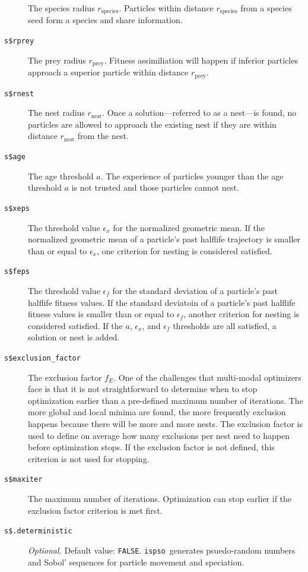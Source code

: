 \documentclass{article}
\def\ispso{\texttt{ispso}}
\begin{document}
\begin{description}
    The species radius $r_\text{species}$.
    Particles within distance $r_\text{species}$ from a species seed form a species and share information.
  \item[\texttt{s\$rprey}]
    The prey radius $r_\text{prey}$.
    Fitness assimiliation will happen if inferior particles approach a superior particle within distance $r_\text{prey}$.
  \item[\texttt{s\$rnest}]
    The nest radius $r_\text{nest}$.
    Once a solution---referred to as a nest---is found, no particles are allowed to approach the existing nest if they are within distance $r_\text{nest}$ from the nest.
  \item[\texttt{s\$age}]
    The age threshold $a$.
    The experience of particles younger than the age threshold $a$ is not trusted and those particles cannot nest.
  \item[\texttt{s\$xeps}]
    The threshold value $\epsilon_x$ for the normalized geometric mean.
    If the normalized geometric mean of a particle's past halflife trajectory is smaller than or equal to $\epsilon_x$, one criterion for nesting is considered satisfied.
  \item[\texttt{s\$feps}]
    The threshold value $\epsilon_f$ for the standard deviation of a particle's past halflife fitness values.
    If the standard deviatoin of a particle's past halflife fitness values is smaller than or equal to $\epsilon_f$, another criterion for nesting is considered satisfied.
    If the $a$, $\epsilon_x$, and $\epsilon_f$ thresholds are all satisfied, a solution or nest is added.
  \item[\texttt{s\$exclusion\_factor}]
    The exclusion factor $f_E$.
    One of the challenges that multi-modal optimizers face is that it is not straightforward to determine when to stop optimization earlier than a pre-defined maximum number of iterations.
    The more global and local minima are found, the more frequently exclusion happens because there will be more and more nests.
    The exclusion factor is used to define on average how many exclusions per nest need to happen before optimization stops.
    If the exclusion factor is not defined, this criterion is not used for stopping.
  \item[\texttt{s\$maxiter}]
    The maximum number of iterations.
    Optimization can stop earlier if the exclusion factor criterion is met first.
  \item[\texttt{s\$.deterministic}]
    \textit{Optional.}
    Default value: \texttt{FALSE}.
    \ispso\ generates psuedo-random numbers and Sobol' sequences for particle movement and speciation.

\end{description}
\end{document}
